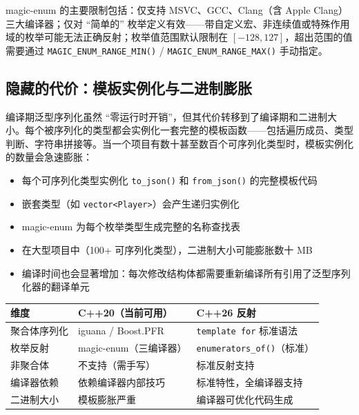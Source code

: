 \documentclass[12pt,a4paper,fontset=fandol]{ctexbook}
\newcommand{\Fn}[1]{\texttt{#1()}}
\newcommand{\Tp}[1]{\texttt{#1}}
\begin{document}
magic-enum 的主要限制包括：仅支持 MSVC、GCC、Clang（含 Apple Clang）三大编译器；仅对 ``简单的'' 枚举定义有效——带自定义宏、非连续值或特殊作用域的枚举可能无法正确反射；枚举值范围默认限制在 $[-128, 127]$，超出范围的值需要通过 \Fn{MAGIC\_ENUM\_RANGE\_MIN} / \Fn{MAGIC\_ENUM\_RANGE\_MAX} 手动指定。

\subsection{隐藏的代价：模板实例化与二进制膨胀}\label{sec:cpp20-bloat}

编译期泛型序列化虽然 ``零运行时开销''，但其代价转移到了编译期和二进制大小。每个被序列化的类型都会实例化一套完整的模板函数——包括遍历成员、类型判断、字符串拼接等。当一个项目有数十甚至数百个可序列化类型时，模板实例化的数量会急速膨胀：

\begin{warning}[title={模板实例化导致的二进制膨胀}]
\begin{itemize}[nosep]
  \item 每个可序列化类型实例化 \Fn{to\_json} 和 \Fn{from\_json} 的完整模板代码
  \item 嵌套类型（如 \Tp{vector<Player>}）会产生递归实例化
  \item magic-enum 为每个枚举类型生成完整的名称查找表
  \item 在大型项目中（100+ 可序列化类型），二进制大小可能膨胀数十 MB
  \item 编译时间也会显著增加：每次修改结构体都需要重新编译所有引用了泛型序列化器的翻译单元
\end{itemize}
\end{warning}

\begin{compare}[title={C++20 现状 vs C++26 反射}]
\begin{tabularx}{\textwidth}{lXX}
\toprule
\textbf{维度} & \textbf{C++20（当前可用）} & \textbf{C++26 反射} \\
\midrule
聚合体序列化 & iguana / Boost.PFR & \texttt{template for} 标准语法 \\
枚举反射 & magic-enum（三编译器） & \Fn{enumerators\_of}（标准） \\
非聚合体 & 不支持（需手写） & 标准反射支持 \\
编译器依赖 & 依赖编译器内部技巧 & 标准特性，全编译器支持 \\
二进制大小 & 模板膨胀严重 & 编译器可优化代码生成 \\
\bottomrule
\end{tabularx}
\end{compare}
\end{document}
